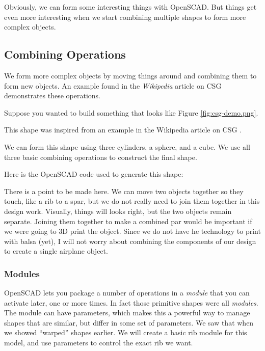 
Obviously, we can form some interesting things with OpenSCAD. But things get
even more interesting when we start combining multiple shapes to form more
complex objects.

\subsection{Combining Operations}

We form more complex objects by moving things around and combining them to form
new objects. An example found in the {\it Wikipedia} article on CSG
demonstrates these operations.

Suppose you wanted to build something that looks like Figure \ref{fig:csg-demo.png}.


This shape was inspired from an example in the Wikipedia article on CSG
\cite{csgwiki}.

We can form this shape using three cylinders, a sphere, and a cube. We use all
three basic combining operations to construct the final shape.

Here is the OpenSCAD code used to generate this shape:


There is a point to be made here. We can move two objects together so they
touch, like a rib to a spar, but we do not really need to join them together in
this design work. Visually, things will looks right, but the two objects remain
separate. Joining them together to make a combined par would be important if we
were going to 3D print the object. Since we do not have he technology to print
with balsa (yet), I will not worry about combining the components of our design
to create a single airplane object.

\subsubsection*{Modules}

OpenSCAD lets you package a number of operations in a {\it module} that you can
activate later, one or more times. In fact those primitive shapes were all {\it
modules}. The module can have parameters, which makes this a powerful way to
manage shapes that are similar, but differ in some set of parameters. We saw
that when we showed ``warped'' shapes earlier. We will create a basic rib
module for this model, and use parameters to control the exact rib we want.

